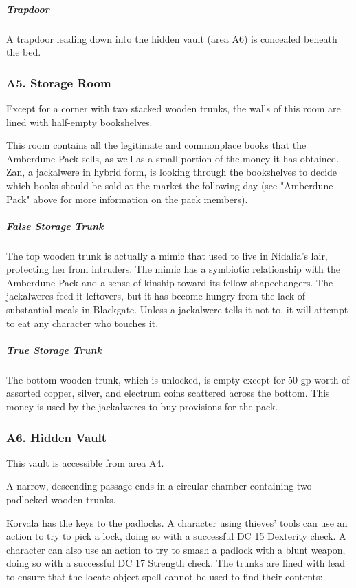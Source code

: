 \documentclass[10pt,a4paper,twoside,bg=print,twocolumn,openany,nodeprecatedcode]{dndbook}
\begin{document}
\subparagraph{Trapdoor}
A trapdoor leading down into the hidden vault (area A6) is concealed beneath the bed.

\subsubsection{A5. Storage Room}
\begin{DndReadAloud}{}
Except for a corner with two stacked wooden trunks, the walls of this room are lined with half-empty bookshelves. 

\end{DndReadAloud}

This room contains all the legitimate and commonplace books that the Amberdune Pack sells, as well as a small portion of the money it has obtained. Zan, a jackalwere in hybrid form, is looking through the bookshelves to decide which books should be sold at the market the following day (see "Amberdune Pack" above for more information on the pack members).

\subparagraph{False Storage Trunk}
The top wooden trunk is actually a mimic that used to live in Nidalia's lair, protecting her from intruders. The mimic has a symbiotic relationship with the Amberdune Pack and a sense of kinship toward its fellow shapechangers. The jackalweres feed it leftovers, but it has become hungry from the lack of substantial meals in Blackgate. Unless a jackalwere tells it not to, it will attempt to eat any character who touches it.

\subparagraph{True Storage Trunk}
The bottom wooden trunk, which is unlocked, is empty except for 50 gp worth of assorted copper, silver, and electrum coins scattered across the bottom. This money is used by the jackalweres to buy provisions for the pack.

\subsubsection{A6. Hidden Vault}
This vault is accessible from area A4.

\begin{DndReadAloud}{}
A narrow, descending passage ends in a circular chamber containing two padlocked wooden trunks. 

\end{DndReadAloud}

Korvala has the keys to the padlocks. A character using thieves' tools can use an action to try to pick a lock, doing so with a successful DC 15 Dexterity check. A character can also use an action to try to smash a padlock with a blunt weapon, doing so with a successful DC 17 Strength check. The trunks are lined with lead to ensure that the locate object spell cannot be used to find their contents:
\end{document}
